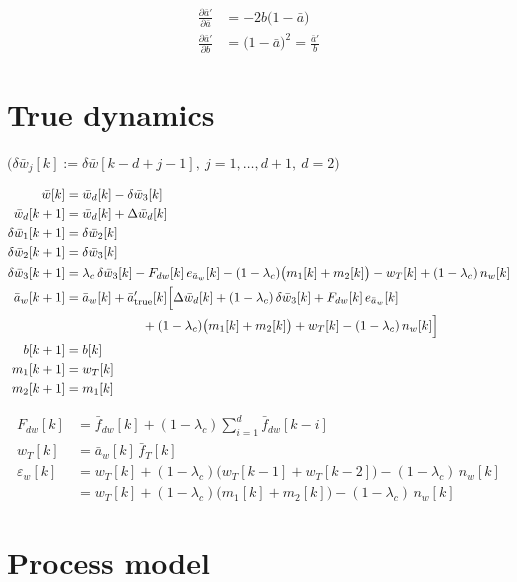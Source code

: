\documentclass[11pt,a4paper,fontset=none]{ctexart}
\newcommand{\ba}{\bar{a}}
\newcommand{\bw}{\bar{w}}
\begin{document}
\begin{align*}
\frac{\partial \ba'}{\partial \ba} &= -2b\bigl(1-\ba\bigr) \\
\frac{\partial \ba'}{\partial b}   &= \bigl(1-\ba\bigr)^{2}
  = \frac{\ba'}{b}
\end{align*}

\section{True dynamics}

$\bigl(\delta\bw_j[k] := \delta\bw[k-d+j-1],\ j = 1,\dots,d+1,\ d = 2\bigr)$

\begin{align*}
\bw[k]           &= \bw_d[k] - \delta\bw_3[k] \\
\bw_d[k+1]       &= \bw_d[k] + \Delta\bw_d[k] \\
\delta\bw_1[k+1] &= \delta\bw_2[k] \\
\delta\bw_2[k+1] &= \delta\bw_3[k] \\
\delta\bw_3[k+1] &= \lambda_c\,\delta\bw_3[k] - F_{dw}[k]\,e_{\ba_w}[k]
                    - (1-\lambda_c)\bigl(m_1[k] + m_2[k]\bigr)
                    - w_T[k] + (1-\lambda_c)\,n_w[k] \\
\ba_w[k+1]       &= \ba_w[k] + \ba'_{\mathrm{true}}[k]\Bigl[
                    \Delta\bw_d[k] + (1-\lambda_c)\,\delta\bw_3[k]
                    + F_{dw}[k]\,e_{\ba_w}[k] \\
                 &\qquad\qquad\qquad
                    + (1-\lambda_c)\bigl(m_1[k] + m_2[k]\bigr)
                    + w_T[k] - (1-\lambda_c)\,n_w[k]\Bigr] \\
b[k+1]           &= b[k] \\
m_1[k+1]         &= w_T[k] \\
m_2[k+1]         &= m_1[k]
\end{align*}

\begin{align*}
F_{dw}[k] &= \bar{f}_{dw}[k] + (1-\lambda_c)\sum_{i=1}^{d}\bar{f}_{dw}[k-i] \\
w_T[k] &= \ba_w[k]\,\bar{f}_T[k] \\
\varepsilon_w[k] &= w_T[k] + (1-\lambda_c)\bigl(w_T[k-1] + w_T[k-2]\bigr)
  - (1-\lambda_c)\,n_w[k] \\
  &= w_T[k] + (1-\lambda_c)\bigl(m_1[k] + m_2[k]\bigr) - (1-\lambda_c)\,n_w[k]
\end{align*}

\section{Process model}
\end{document}
